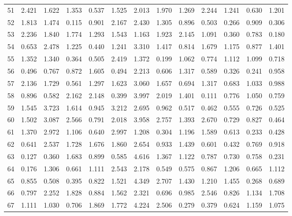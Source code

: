 \begin{tabular}{lrrrrrrrrrrrr}
51  &  2.421 &  1.622 &  1.353 &  0.537 &  1.525 &  2.013 &  1.970 &  1.269 &  2.244 &  1.241 &  0.630 &  1.201 \\
52  &  1.813 &  1.474 &  0.115 &  0.901 &  2.167 &  2.430 &  1.305 &  0.896 &  0.503 &  0.266 &  0.909 &  0.306 \\
53  &  2.236 &  1.840 &  1.774 &  1.293 &  1.543 &  1.163 &  1.923 &  2.145 &  1.091 &  0.360 &  0.783 &  0.180 \\
54  &  0.653 &  2.478 &  1.225 &  0.440 &  1.241 &  3.310 &  1.417 &  0.814 &  1.679 &  1.175 &  0.877 &  1.401 \\
55  &  1.352 &  1.340 &  0.364 &  0.505 &  2.419 &  1.372 &  0.199 &  1.062 &  0.774 &  1.112 &  1.099 &  0.718 \\
56  &  0.496 &  0.767 &  0.872 &  1.605 &  0.494 &  2.213 &  0.606 &  1.317 &  0.589 &  0.326 &  0.241 &  0.958 \\
57  &  2.136 &  1.729 &  0.561 &  1.297 &  1.623 &  3.060 &  1.657 &  0.694 &  1.317 &  0.683 &  1.033 &  0.988 \\
58  &  0.896 &  0.582 &  2.162 &  2.148 &  0.399 &  3.997 &  2.019 &  1.401 &  0.111 &  0.776 &  1.050 &  0.759 \\
59  &  1.545 &  3.723 &  1.614 &  0.945 &  3.212 &  2.695 &  0.962 &  0.517 &  0.462 &  0.555 &  0.726 &  0.525 \\
60  &  1.502 &  3.087 &  2.566 &  0.791 &  2.018 &  3.958 &  2.757 &  1.393 &  2.670 &  0.729 &  0.827 &  0.464 \\
61  &  1.370 &  2.972 &  1.106 &  0.640 &  2.997 &  1.208 &  0.304 &  1.196 &  1.589 &  0.613 &  0.233 &  0.428 \\
62  &  0.641 &  2.537 &  1.728 &  1.676 &  1.860 &  2.654 &  0.933 &  1.439 &  0.601 &  0.432 &  0.769 &  0.918 \\
63  &  0.127 &  0.360 &  1.683 &  0.899 &  0.585 &  4.616 &  1.367 &  1.122 &  0.787 &  0.730 &  0.758 &  0.231 \\
64  &  0.176 &  1.306 &  0.661 &  1.111 &  2.543 &  2.178 &  0.549 &  0.575 &  0.867 &  1.206 &  0.665 &  1.112 \\
65  &  0.855 &  0.508 &  0.395 &  0.822 &  1.521 &  4.349 &  2.707 &  1.430 &  1.210 &  1.455 &  0.268 &  0.689 \\
66  &  0.797 &  2.252 &  1.828 &  0.884 &  1.562 &  2.321 &  0.696 &  0.985 &  2.546 &  0.826 &  1.134 &  1.708 \\
67  &  1.111 &  1.030 &  0.706 &  1.869 &  1.772 &  4.224 &  2.506 &  0.279 &  0.379 &  0.624 &  1.159 &  1.075 \\

\end{tabular}

